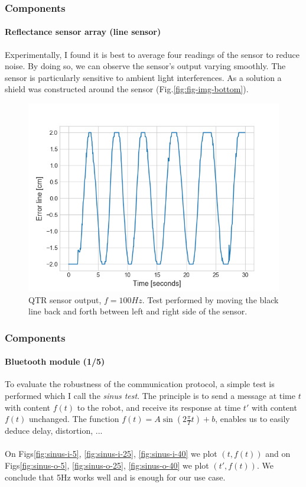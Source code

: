 \documentclass[10pt]{beamer}
\begin{document}
\begin{frame}
\frametitle{Components}
\framesubtitle{Reflectance sensor array (line sensor)}
Experimentally, I found it is best to average four readings of the sensor to reduce noise. By doing so, we can observe the sensor's output varying smoothly. The sensor is particularly sensitive to ambient light interferences. As a solution a shield was constructed around the sensor (Fig.\ref{fig:fig-img-bottom}).
\vspace*{-2mm}
\begin{figure}[hbtp]
\centering
\includegraphics[scale=0.42]{figures/qtr-flow.png}
\vspace*{-4mm}
\caption{QTR sensor output, $f=100Hz$. Test performed by moving the black line back and forth between left and right side of the sensor.}
\label{fig:flow-qtr}
\end{figure}
\end{frame}


\begin{frame}
\frametitle{Components}
\framesubtitle{Bluetooth module (1/5)}
To evaluate the robustness of the communication protocol, a simple test is performed which I call the \textit{sinus test}. The principle is to send a message at time $t$ with content $f(t)$ to the robot, and receive its response at time $t'$ with content $f(t)$ unchanged. The function $f(t) = A\sin(2\frac{\pi}{T}t)+b$, enables us to easily deduce delay, distortion, ... \\~\\
On Figs\ref{fig:sinus-i-5}, \ref{fig:sinus-i-25}, \ref{fig:sinus-i-40} we plot $(t,f(t))$ and on Figs\ref{fig:sinus-o-5}, \ref{fig:sinus-o-25}, \ref{fig:sinus-o-40} we plot $(t',f(t))$. We conclude that 5Hz works well and is enough for our use case.
\end{frame}
\end{document}
